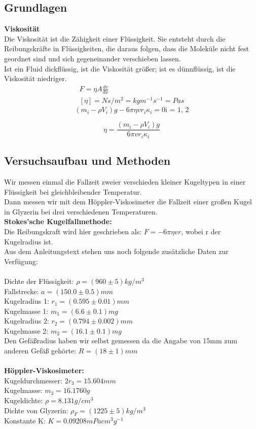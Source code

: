 \documentclass{article}
\begin{document}
\subsection{Grundlagen}
\textbf{Viskosität}\\
Die Viskosität ist die Zähigkeit einer Flüssigkeit. Sie entsteht durch die Reibungskräfte in Flüssigkeiten, die daraus folgen, dass die Moleküle nicht fest geordnet sind und sich gegeneinander verschieben lassen.\\
Ist ein Fluid dickflüssig, ist die Viskosität größer; ist es dünnflüssig, ist die Viskosität niedriger.\\
\begin{gather}
F=\eta A \frac{dv}{dx}\\
[\eta]=N s/m^2 = kg m^{-1}s^{-1} = Pa s
\end{gather}
\begin{equation}
(m_i-\rho V_i)g - 6\pi\eta v r_i \kappa_i = 0 \text{i = 1, 2}
\end{equation}

\begin{equation}
\label{stokes}
\eta=\frac{(m_i-\rho V_i)g}{6\pi v r_i \kappa_i}
\end{equation}
\subsection{Versuchsaufbau und Methoden}
Wir messen einmal die Fallzeit zweier verschieden kleiner Kugeltypen in einer Flüssigkeit bei gleichbleibender Temperatur. \\
Dann messen wir mit dem Höppler-Viskosimeter die Fallzeit einer großen Kugel in Glyzerin bei drei verschiedenen Temperaturen. \\
\textbf{Stokes'sche Kugelfallmethode:}\\
Die Reibungskraft wird hier geschrieben als:
$F = -6 \pi \eta v r$, wobei r der Kugelradius ist. \\
Aus dem Anleitungstext stehen uns noch folgende zusätzliche Daten zur Verfügung:\\
\\
Dichte der Flüssigkeit: $\rho=(960 \pm 5) kg/m^3$\\
Fallstrecke: $a=(150.0 \pm 0.5)mm$\\
Kugelradius 1: $r_1=(0.595 \pm 0.01)mm$\\
Kugelmasse 1: $m_1=(6.6 \pm 0.1)mg$\\
Kugelradius 2: $r_2=(0.794 \pm 0.002)mm$\\
Kugelmasse 2: $m_2=(16.1 \pm 0.1)mg$\\
Den Gefäßradius haben wir selbst gemessen da die Angabe von 15mm zum anderen Gefäß gehörte: $R=(18 \pm 1)mm$\\ 
\\
\textbf{Höppler-Viskosimeter:}\\
Kugeldurchmesser: $2r_3=15.604mm$\\
Kugelmasse: $m_3=16.1760g$\\
Kugeldichte: $\rho=8.131 g/cm^3$\\
Dichte von Glyzerin: $\rho_F=(1225 \pm 5)kg/m^3$\\
Konstante K: $K=0.09208mPa cm^3 g^{-1}$\\
\end{document}
